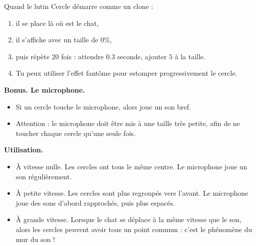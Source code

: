 \documentclass[class=report,crop=false, 12pt]{standalone}
\begin{document}
\begin{activite}
Quand le lutin \og{}Cercle\fg{} démarre comme un clone :
\begin{enumerate}
  \item il se place là où est le chat,
  \item il s'affiche avec un taille de $0\%$,
  \item puis répète $20$ fois : attendre $0.3$ seconde, ajouter $5$ à la taille.
  \item Tu peux utiliser l'effet \og fantôme \fg{} pour estomper progressivement le cercle.
\end{enumerate}


\bigskip
\textbf{Bonus. Le microphone.}

\begin{itemize}
  \item Si un cercle touche le microphone, alors joue un son bref.
  \item Attention : le microphone doit être mis à une taille très petite, afin de ne toucher chaque cercle qu'une seule fois.
\end{itemize}




\bigskip
\textbf{Utilisation.}

\begin{itemize}
  \item À vitesse nulle. Les cercles ont tous le même centre. Le microphone joue un son régulièrement.
  
  \item À petite vitesse. Les cercles sont plus regroupés vers l'avant. Le microphone joue des sons d'abord rapprochés, puis plus espacés. 
  
  \item À grande vitesse. Lorsque le chat se déplace à la même vitesse que le son, alors les cercles peuvent avoir tous un point commun : c'est le phénomène du mur du son ! 
\end{itemize}

\end{activite}
\end{document}
